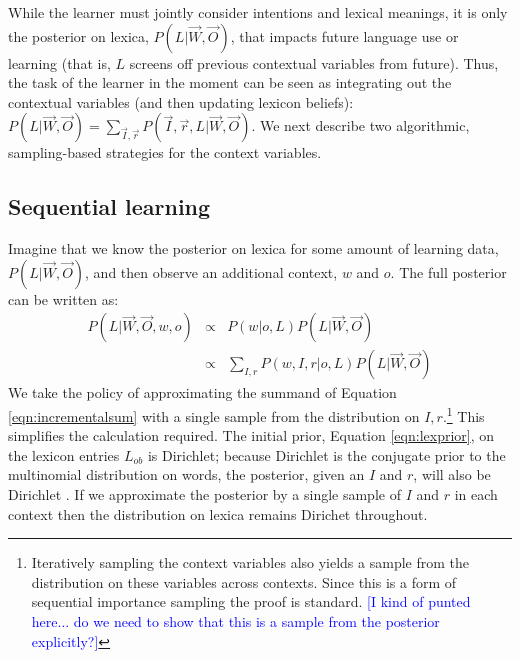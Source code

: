 \documentclass[man,noapacite,12pt]{apa2}
\newcommand{\nnote}[1]{\textcolor{blue}{[#1]}}
\begin{document}
While the learner must jointly consider intentions and lexical meanings, it is only the posterior on lexica, $P(L|\vec{W},\vec{O})$, that impacts future language use or learning (that is, $L$ screens off previous contextual variables from future). Thus, the task of the learner in the moment can be seen as integrating out the contextual variables (and then updating lexicon beliefs): $P(L|\vec{W},\vec{O}) = \sum_{\vec{I}, \vec{r}} P( \vec{I}, \vec{r}, L | \vec{W}, \vec{O})$. We next describe two algorithmic, sampling-based strategies for the context variables.


\subsection{Sequential learning}

Imagine that we know the posterior on lexica for some amount of learning data,  $P(L|\vec{W},\vec{O})$, and then observe an additional context, $w$ and $o$. The full posterior can be written as:
\begin{eqnarray}
P(L|\vec{W},\vec{O}, w, o) &\propto& P(w|o,L)P(L|\vec{W},\vec{O}) \\
\label{eqn:incrementalsum} &\propto&  \sum_{I,r} P(w,I,r|o,L) P(L|\vec{W},\vec{O})
\end{eqnarray}
We take the policy of approximating the summand of Equation \ref{eqn:incrementalsum} with a single sample from the distribution on $I,r$.\footnote{Iteratively sampling the context variables also yields a sample from the distribution on these variables across contexts. Since this is a form of sequential importance sampling the proof is standard. \nnote{I kind of punted here... do we need to show that this is a sample from the posterior explicitly?}} 
This simplifies the calculation required.
The initial prior, Equation \ref{eqn:lexprior}, on the lexicon entries $L_{ob}$ is Dirichlet; because Dirichlet is the conjugate prior to the multinomial distribution on words, the posterior, given an $I$ and $r$, will also be Dirichlet \cite{somethingOnConjugacy}. If we approximate the posterior by a single sample of $I$ and $r$ in each context then the distribution on lexica remains Dirichet throughout. 
\end{document}
